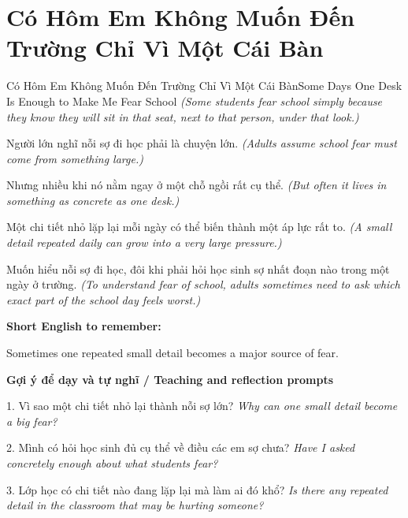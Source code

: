 \section{Có Hôm Em Không Muốn Đến Trường Chỉ Vì Một Cái Bàn}
\begin{truyen}{Có Hôm Em Không Muốn Đến Trường Chỉ Vì Một Cái Bàn}{Some Days One Desk Is Enough to Make Me Fear School}
\textit{(Some students fear school simply because they know they will sit in that seat, next to that person, under that look.)}

Người lớn nghĩ nỗi sợ đi học phải là chuyện lớn.
\textit{(Adults assume school fear must come from something large.)}

Nhưng nhiều khi nó nằm ngay ở một chỗ ngồi rất cụ thể.
\textit{(But often it lives in something as concrete as one desk.)}

Một chi tiết nhỏ lặp lại mỗi ngày có thể biến thành một áp lực rất to.
\textit{(A small detail repeated daily can grow into a very large pressure.)}

\end{truyen}

\begin{baihoc}
Muốn hiểu nỗi sợ đi học, đôi khi phải hỏi học sinh sợ nhất đoạn nào trong một ngày ở trường.
\textit{(To understand fear of school, adults sometimes need to ask which exact part of the school day feels worst.)}
\end{baihoc}

\begin{ghinhoanh}
\textbf{Short English to remember:}

Sometimes one repeated small detail becomes a major source of fear.

\end{ghinhoanh}

\begin{tuhocnhanh}
\textbf{Gợi ý để dạy và tự nghĩ / Teaching and reflection prompts}

1. Vì sao một chi tiết nhỏ lại thành nỗi sợ lớn? \textit{Why can one small detail become a big fear?}

2. Mình có hỏi học sinh đủ cụ thể về điều các em sợ chưa? \textit{Have I asked concretely enough about what students fear?}

3. Lớp học có chi tiết nào đang lặp lại mà làm ai đó khổ? \textit{Is there any repeated detail in the classroom that may be hurting someone?}
\end{tuhocnhanh}
\ngancach

